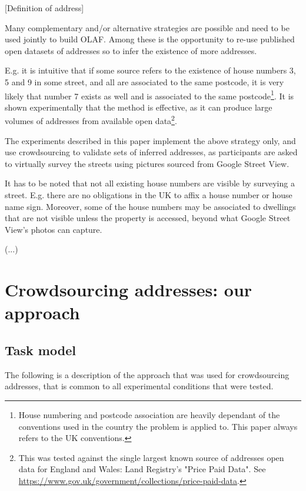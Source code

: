 \documentclass{llncs}
\begin{document}
    {[}Definition of address{]}
    
    Many complementary and/or alternative strategies are possible and need to be used jointly to build OLAF. Among these is the opportunity to re-use published open datasets of addresses so to infer the existence of more addresses. 
    
    E.g. it is intuitive that if some source refers to the existence of house numbers 3, 5 and 9 in some street, and all are associated to the same postcode, it is very likely that number 7 exists as well and is associated to the same postcode\footnote{House numbering and postcode association are heavily dependant of the conventions used in the country the problem is applied to. This paper always refers to the UK conventions.}. It is shown experimentally that the method is effective, as it can produce large volumes of addresses from available open data\footnote{This was tested against the single largest known source of addresses open data for England and Wales: Land Registry's "Price Paid Data". See \url{https://www.gov.uk/government/collections/price-paid-data}.}.
    
    The experiments described in this paper implement the above strategy only, and  use crowdsourcing to validate sets of inferred addresses, as participants are asked to virtually survey the streets using pictures sourced from Google Street View.
    
    It has to be noted that not all existing house numbers are visible by surveying a street. E.g. there are no obligations in the UK to affix a house number or house name sign. Moreover, some of the house numbers may be associated to dwellings that are not visible unless the property is accessed, beyond what Google Street View's photos can capture.
    
    {(}...{)}

\section{Crowdsourcing addresses: our approach}

\subsection{Task model}

    The following is a description of the approach that was used for crowdsourcing addresses, that is common to all experimental conditions that were tested.
    
\end{document}
